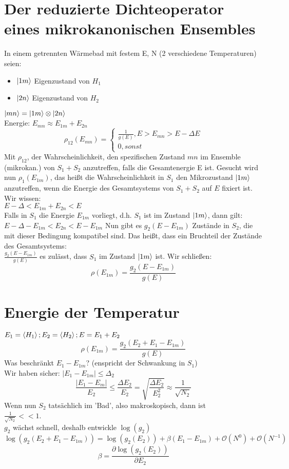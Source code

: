 \section{Der reduzierte Dichteoperator eines mikrokanonischen Ensembles}
In einem getrennten Wärmebad mit festem E, N (2 verschiedene Temperaturen) seien:
\begin{itemize}
    \item $\ket{1m}$ Eigenzustand von $H_1$
    \item $\ket{2n}$ Eigenzustand von $H_2$
\end{itemize}
$\ket{mn}=\ket{1m}\otimes\ket{2n}$\\
Energie: $E_{mn} \approx E_{1m} + E_{2n}$
\begin{equation*}
    \rho _{12}(E_{mn}) = \begin{cases}\frac{1}{g(E)} , E>E_{mn}>E-\Delta E\\0 , sonst\end{cases}
\end{equation*}
Mit $\rho _{12}$, der Wahrscheinlichkeit, den spezifischen Zustand $mn$ im Ensemble (mikrokan.) von $S_1 + S_2$ anzutreffen, falls die Gesamtenergie E ist.
Gesucht wird nun $\rho _1 (E_{1m})$,
das heißt die Wahrscheinlichkeit in $S_1$ den Mikrozustand $\ket{1m}$ anzutreffen, wenn die Energie des Gesamtsystems von $S_1+S_2$ auf $E$ fixiert ist.\\
Wir wissen:\\
$E - \Delta < E_{1m} + E_{2n} < E$\\
Falls in $S_1$ die Energie $E_{1m}$ vorliegt, d.h. $S_1$ ist im Zustand $\ket{1m}$, dann gilt:\\
$E - \Delta -E_{1m} < E_{2n} < E - E_{1m}$
Nun gibt es $g_2(E-E_{1m})$ Zustände in $S_2$, die mit dieser Bedingung kompatibel sind.
Das heißt, dass ein Bruchteil der Zustände des Gesamtsystems:\\
$\frac{g_2(E-E_{1m})}{g(E)}$
es zulässt, dass $S_1$ im Zustand $\ket{1m}$ ist. Wir schließen:
\begin{equation*}
    \rho(E_{1m}) = \frac{g_2(E-E_{1m})}{g(E)}
\end{equation*}
\section{Energie der Temperatur}
$E_1 = \braket{H_1}; E_2 = \braket{H_2}; E = E_1 + E_2$
$$\rho(E_{1m}) = \frac{g_2(E_2+E_1-E_{1m})}{g(E)}$$
Was beschränkt $E_1 - E_{1m}$? (enspricht der Schwankung in $S_1$)\\
Wir haben sicher: $|E_1 - E_{1m}| \leq \Delta _2$
\begin{equation*}
    \frac{|E_1 - E_m|}{E_2}\leq\frac{\Delta E_2}{E_2}=\sqrt{\frac{\Delta E_2}{E_2^2}}\approx\frac 1{\sqrt{N_2}}
\end{equation*}
Wenn nun $S_2$ tatsächlich im ’Bad’,
also makroskopisch, dann ist\\ $\frac 1{\sqrt{N_2}} << 1$.\\
$g_2$ wächst schnell, deshalb entwickle $\log(g_2)$
\begin{equation*}
    \log(g_2(E_2+E_1-E_{1m})) = \log(g_2(E_2))+\beta(E_1-E_{1m}) + \mathcal{O}{(N^0)} + \mathcal{O}{(N^{-1})}
\end{equation*}
$$\beta = \frac{\partial \log(g_2(E_2))}{\partial E_2}$$
